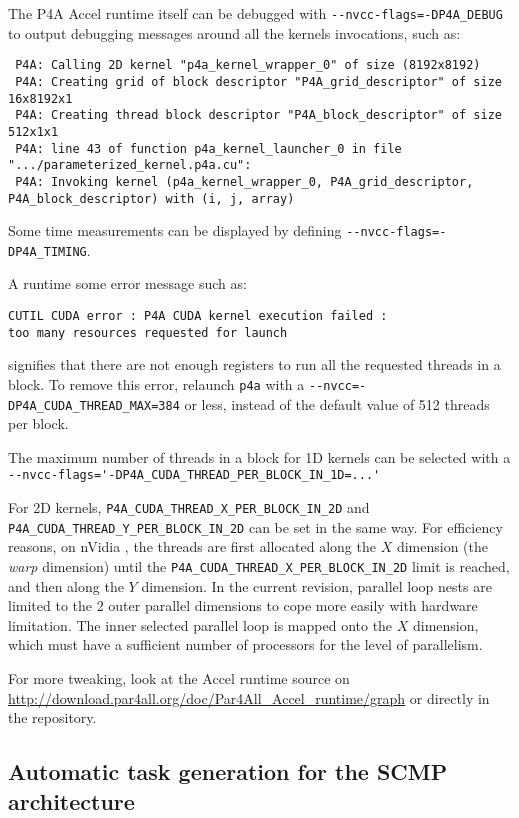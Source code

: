 \documentclass[a4paper]{article}
\begin{document}
The P4A Accel runtime itself can be debugged with
\verb|--nvcc-flags=-DP4A_DEBUG| to output debugging messages around all
the \Acuda kernels invocations, such as: {\scriptsize
\begin{verbatim}
 P4A: Calling 2D kernel "p4a_kernel_wrapper_0" of size (8192x8192)
 P4A: Creating grid of block descriptor "P4A_grid_descriptor" of size 16x8192x1
 P4A: Creating thread block descriptor "P4A_block_descriptor" of size 512x1x1
 P4A: line 43 of function p4a_kernel_launcher_0 in file ".../parameterized_kernel.p4a.cu":
 P4A: Invoking kernel (p4a_kernel_wrapper_0, P4A_grid_descriptor, P4A_block_descriptor) with (i, j, array)
\end{verbatim}
}

Some time measurements can be displayed by defining
\verb|--nvcc-flags=-DP4A_TIMING|.

A runtime some error message such as:
\begin{verbatim}
CUTIL CUDA error : P4A CUDA kernel execution failed :
too many resources requested for launch
\end{verbatim}
signifies that there are not enough registers to run all the requested
threads in a block. To remove this error,
relaunch \texttt{p4a} with a
\verb|--nvcc=-DP4A_CUDA_THREAD_MAX=384| or less, instead of the default
value of 512 threads per block.

The maximum number of threads in a block for 1D
kernels can be selected with a
\verb|--nvcc-flags='-DP4A_CUDA_THREAD_PER_BLOCK_IN_1D=...'|

For 2D kernels, \verb|P4A_CUDA_THREAD_X_PER_BLOCK_IN_2D| and
\verb|P4A_CUDA_THREAD_Y_PER_BLOCK_IN_2D| can be set in the same way. For
efficiency reasons, on nVidia \Agpu, the threads are first allocated along
the $X$ dimension (the \emph{warp} dimension) until the
\verb|P4A_CUDA_THREAD_X_PER_BLOCK_IN_2D| limit is reached, and then along
the $Y$ dimension. In the current revision, parallel loop nests are
limited to the 2 outer parallel dimensions to cope more easily with \Acuda
\Agpu hardware limitation. The inner selected parallel loop is mapped onto
the $X$ \Agpu dimension, which must have a sufficient number of processors
for the level of parallelism.

For more tweaking, look at the \Apfa Accel runtime source on
\url{http://download.par4all.org/doc/Par4All_Accel_runtime/graph} or
directly in the \Agit repository.

\subsection{Automatic task generation for the SCMP architecture}
\label{sec:scmp}
\end{document}
